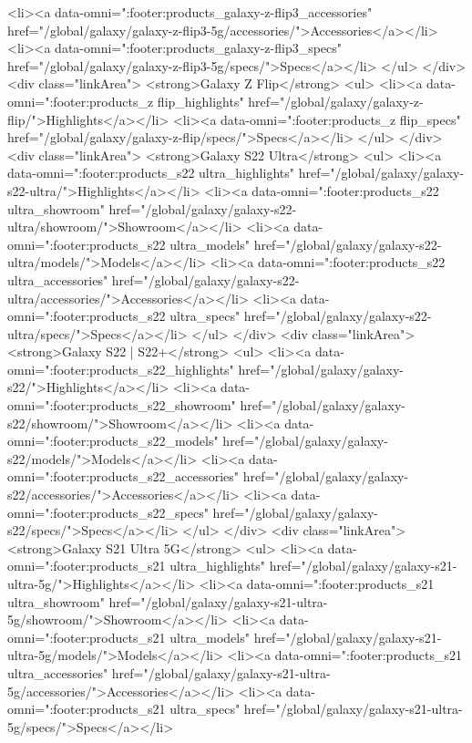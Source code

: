 {{{{{{{{{{{{{{{{{{{{{{{{{{{{{{{{{{{{{{{{{{{{{{{{{{{{{				<li><a data-omni=":footer:products_galaxy-z-flip3_accessories" href="/global/galaxy/galaxy-z-flip3-5g/accessories/">Accessories</a></li>
				<li><a data-omni=":footer:products_galaxy-z-flip3_specs" href="/global/galaxy/galaxy-z-flip3-5g/specs/">Specs</a></li>
			</ul>
		</div>
		<div class="linkArea">
			<strong>Galaxy Z Flip</strong>
			<ul>
				<li><a data-omni=":footer:products_z flip_highlights" href="/global/galaxy/galaxy-z-flip/">Highlights</a></li>
				<li><a data-omni=":footer:products_z flip_specs" href="/global/galaxy/galaxy-z-flip/specs/">Specs</a></li>
			</ul>
		</div>
		<div class="linkArea">
			<strong>Galaxy S22 Ultra</strong>
			<ul>
				<li><a data-omni=":footer:products_s22 ultra_highlights" href="/global/galaxy/galaxy-s22-ultra/">Highlights</a></li>
				<li><a data-omni=":footer:products_s22 ultra_showroom" href="/global/galaxy/galaxy-s22-ultra/showroom/">Showroom</a></li>
				<li><a data-omni=":footer:products_s22 ultra_models" href="/global/galaxy/galaxy-s22-ultra/models/">Models</a></li>
				<li><a data-omni=":footer:products_s22 ultra_accessories" href="/global/galaxy/galaxy-s22-ultra/accessories/">Accessories</a></li>
				<li><a data-omni=":footer:products_s22 ultra_specs" href="/global/galaxy/galaxy-s22-ultra/specs/">Specs</a></li>
			</ul>
		</div>
		<div class="linkArea">
			<strong>Galaxy S22 | S22+</strong>
			<ul>
				<li><a data-omni=":footer:products_s22_highlights" href="/global/galaxy/galaxy-s22/">Highlights</a></li>
				<li><a data-omni=":footer:products_s22_showroom" href="/global/galaxy/galaxy-s22/showroom/">Showroom</a></li>
				<li><a data-omni=":footer:products_s22_models" href="/global/galaxy/galaxy-s22/models/">Models</a></li>
				<li><a data-omni=":footer:products_s22_accessories" href="/global/galaxy/galaxy-s22/accessories/">Accessories</a></li>
				<li><a data-omni=":footer:products_s22_specs" href="/global/galaxy/galaxy-s22/specs/">Specs</a></li>
			</ul>
		</div>
		<div class="linkArea">
			<strong>Galaxy S21 Ultra 5G</strong>
			<ul>
				<li><a data-omni=":footer:products_s21 ultra_highlights" href="/global/galaxy/galaxy-s21-ultra-5g/">Highlights</a></li>
				<li><a data-omni=":footer:products_s21 ultra_showroom" href="/global/galaxy/galaxy-s21-ultra-5g/showroom/">Showroom</a></li>
				<li><a data-omni=":footer:products_s21 ultra_models" href="/global/galaxy/galaxy-s21-ultra-5g/models/">Models</a></li>
				<li><a data-omni=":footer:products_s21 ultra_accessories" href="/global/galaxy/galaxy-s21-ultra-5g/accessories/">Accessories</a></li>
				<li><a data-omni=":footer:products_s21 ultra_specs" href="/global/galaxy/galaxy-s21-ultra-5g/specs/">Specs</a></li>
}}}}}}}}}}}}}}}}}}}}}}}}}}}}}}}}}}}}}}}}}}}}}}}}}}}}}
